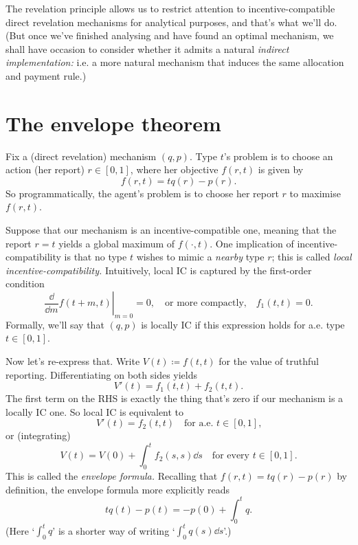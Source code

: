 The revelation principle allows us to restrict attention to incentive-compatible direct revelation mechanisms for analytical purposes, and that's what we'll do.
(But once we've finished analysing and have found an optimal mechanism,
we shall have occasion to consider whether it admits a natural \emph{indirect implementation:} i.e. a more natural mechanism that induces the same allocation and payment rule.)



\section{The envelope theorem}
\label{sec:ch1:env}

Fix a (direct revelation) mechanism $(q,p)$.
Type $t$'s problem is to choose an action (her report) $r \in [0,1]$, where her objective $f(r,t)$ is given by
%
\begin{equation*}
	f(r,t) = t q(r) - p(r) .
\end{equation*}
%
So programmatically, the agent's problem is to choose her report $r$ to maximise $f(r,t)$.

Suppose that our mechanism is an incentive-compatible one,
meaning that the report $r=t$ yields a global maximum of $f(\cdot,t)$.
One implication of incentive-compatibility is that no type $t$ wishes to mimic a \emph{nearby} type $r$; this is called \emph{local incentive-compatibility.}
Intuitively, local IC is captured by the first-order condition
%
\begin{equation*}
	\left. \frac{\dd}{\dd m} f( t+m, t ) \right|_{m=0} = 0 ,
	\quad \text{or more compactly,} \quad
	f_1(t,t)=0 .
\end{equation*}
%
Formally, we'll say that $(q,p)$ is locally IC if this expression holds for a.e. type $t \in [0,1]$.


Now let's re-express that.
Write $V(t) \coloneqq f(t,t)$ for the value of truthful reporting.
Differentiating on both sides yields
%
\begin{equation*}
	V'(t)
	= f_1(t,t) + f_2(t,t) .
\end{equation*}
%
The first term on the RHS is exactly the thing that's zero if our mechanism is a locally IC one.
So local IC is equivalent to
%
\begin{equation*}
	V'(t) = f_2(t,t)
	\quad \text{for a.e. $t \in [0,1]$,}
\end{equation*}
%
or (integrating)
%
\begin{equation*}
	V(t) = V(0) + \int_0^t f_2(s,s) \dd s
	\quad \text{for every $t \in [0,1]$.}
\end{equation*}
%
This is called the \emph{envelope formula.}
Recalling that $f(r,t) = t q(r) - p(r)$ by definition,
the envelope formula more explicitly reads
%
\begin{equation*}
	t q(t) - p(t) = - p(0) + \int_0^t q .
\end{equation*}
%
(Here `$\int_0^t q$' is a shorter way of writing `$\int_0^t q(s) \dd s$'.)


